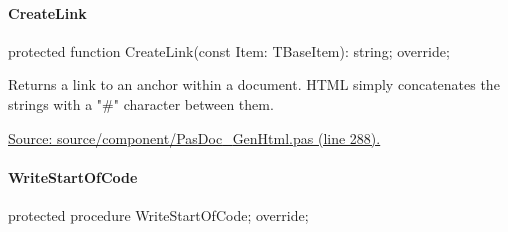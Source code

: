 \documentclass{report}
\newif\ifpdf
\begin{document}
\paragraph*{CreateLink}\hspace*{\fill}

\label{PasDoc_GenHtml.TGenericHTMLDocGenerator-CreateLink}
\begin{list}{}{
\setlength{\itemindent}{0cm}
\setlength{\listparindent}{0cm}
\setlength{\leftmargin}{\evensidemargin}
\addtolength{\leftmargin}{\tmplength}
\settowidth{\labelsep}{X}
\addtolength{\leftmargin}{\labelsep}
\setlength{\labelwidth}{\tmplength}
}
\item[\textbf{Declaration}\hfill]
\ifpdf
\begin{flushleft}
\fi
\begin{ttfamily}
protected function CreateLink(const Item: TBaseItem): string; override;\end{ttfamily}

\ifpdf
\end{flushleft}
\fi

\par
\item[\textbf{Description}]
Returns a link to an anchor within a document. HTML simply concatenates the strings with a "{\#}" character between them.\par
\href{https://github.com/pasdoc/pasdoc/blob/master/source/component/PasDoc_GenHtml.pas#L288}{Source: source/component/PasDoc{\_}GenHtml.pas (line 288).}

\end{list}
\paragraph*{WriteStartOfCode}\hspace*{\fill}

\label{PasDoc_GenHtml.TGenericHTMLDocGenerator-WriteStartOfCode}
\begin{list}{}{
\setlength{\itemindent}{0cm}
\setlength{\listparindent}{0cm}
\setlength{\leftmargin}{\evensidemargin}
\addtolength{\leftmargin}{\tmplength}
\settowidth{\labelsep}{X}
\addtolength{\leftmargin}{\labelsep}
\setlength{\labelwidth}{\tmplength}
}
\item[\textbf{Declaration}\hfill]
\ifpdf
\begin{flushleft}
\fi
\begin{ttfamily}
protected procedure WriteStartOfCode; override;\end{ttfamily}

\ifpdf
\end{flushleft}
\fi

\end{list}
\end{document}
